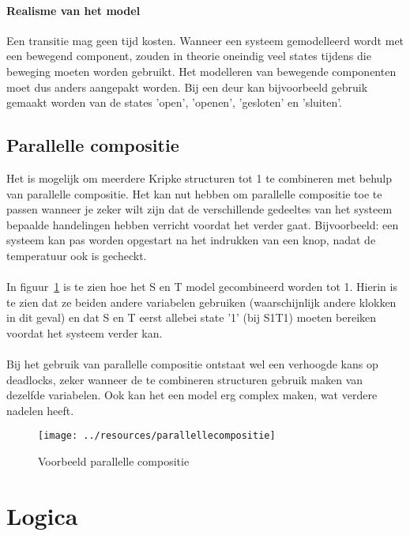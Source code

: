 \documentclass{article}
\begin{document}
      \paragraph{Realisme van het model}
        Een transitie mag geen tijd kosten. Wanneer een systeem gemodelleerd wordt met een bewegend component, zouden in theorie oneindig veel states tijdens die beweging moeten worden gebruikt. Het modelleren van bewegende componenten moet dus anders aangepakt worden. Bij een deur kan bijvoorbeeld gebruik gemaakt worden van de states 'open', 'openen', 'gesloten' en 'sluiten'.


  \subsection{Parallelle compositie}
    Het is mogelijk om meerdere Kripke structuren tot 1 te combineren met behulp van parallelle compositie. Het kan nut hebben om parallelle compositie toe te passen wanneer je zeker wilt zijn dat de verschillende gedeeltes van het systeem bepaalde handelingen hebben verricht voordat het verder gaat. Bijvoorbeeld: een systeem kan pas worden opgestart na het indrukken van een knop, nadat de temperatuur ook is gecheckt.\\\\
    In figuur~\ref{fig:parallellecompositie} is te zien hoe het S en T model gecombineerd worden tot 1. Hierin is te zien dat ze beiden andere variabelen gebruiken (waarschijnlijk andere klokken in dit geval) en dat S en T eerst allebei state '1' (bij S1T1) moeten bereiken voordat het systeem verder kan. \\\\
    Bij het gebruik van parallelle compositie ontstaat wel een verhoogde kans op deadlocks, zeker wanneer de te combineren structuren gebruik maken van dezelfde variabelen. Ook kan het een model erg complex maken, wat verdere nadelen heeft.
    \begin{figure}[h]
      \centering
      \texttt{[image: ../resources/parallellecompositie]}
      \caption{Voorbeeld parallelle compositie}
      \label{fig:parallellecompositie}
    \end{figure}


\clearpage
\section{Logica}
\end{document}
